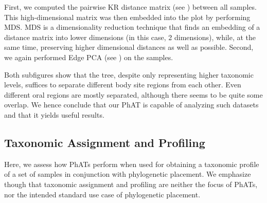 

First, we computed the pairwise KR distance matrix
(see ) between all samples.
This high-dimensional matrix was then embedded into the plot by performing \acf{MDS}.
\ac{MDS} \cite{Mardia1978,Krzanowski1994,Everitt2010} is a dimensionality reduction technique that
finds an embedding of a distance matrix into lower dimensions (in this case, \num{2} dimensions),
while, at the same time, preserving higher dimensional distances as well as possible.
Second, we again performed Edge PCA \cite{Matsen2011a}
(see ) on the samples.

Both subfigures show that the tree, despite only representing higher taxonomic levels,
suffices to separate different body site regions from each other.
Even different oral regions are mostly separated, although there seems to be quite some overlap.
We hence conclude that our \ac{PhAT} is capable of analyzing such datasets and that it yields useful results.


\subsection{Taxonomic Assignment and Profiling}
\label{ch:AutomaticTrees:sec:Evaluation:sub:TaxonomicAssignmentProfiling}

Here, we assess how \acp{PhAT} perform when used
for obtaining a taxonomic profile of a set of samples in conjunction with phylogenetic placement.
We emphasize though that taxonomic assignment and profiling are neither the focus of \acp{PhAT},
nor the intended standard use case of phylogenetic placement.

